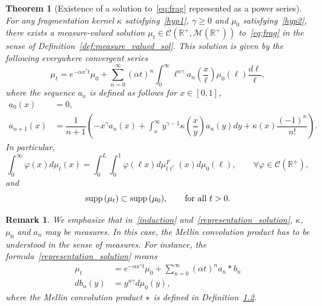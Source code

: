 \documentclass[10pt,a4paper]{amsart}
\numberwithin{equation}{section}
\newcommand*\dst{\displaystyle}
\renewcommand*\a{\alpha}
\newcommand*\R{\mathbb{R}}
\newcommand*\M{\mathcal{M}}
\newcommand{\clC}{\mathcal{C}}
\newcommand{\MT}[1]{{\textcolor{black}{#1}}}
\newcommand*\supp{{\mbox{\small\rm supp}}\,}
\let\oldforall\forall
\renewcommand*{\forall}{\mathrel{\oldforall}}
\newtheorem{theo}[defi]{Theorem}
\newtheorem{rema}[defi]{Remark}
\begin{document}
\begin{theo}[Existence of a solution to~\eqref{eq:frag} represented as a power series]\label{thm:power_serie}
For any fragmentation kernel $\kappa $ satisfying~\eqref{hyp1}, $\gamma\geq 0$ and $\mu_0$ satisfying~\eqref{hyp2}, there exists a measure-valued solution $\mu_t\in\clC(\R^+,\M(\R^+))$ to~\eqref{eq:frag} in the sense of Definition~\ref{def:measure_valued_sol}. This solution is given by the following everywhere convergent series
\begin{equation}\label{representation_solution}
\mu_t = e^{-\a x^{\gamma}t} \mu_0 + \sum_{n=0}^{\infty} (\a t)^n
\dst\int_0^{\infty} \ell^{n\gamma}a_n\left(\dfrac{x}{\ell}\right)\mu_0(\ell) \dfrac{d\ell}\ell{},
\end{equation}
where the sequence $a_n$ is defined as follows for $x\in [0,1]$,
\begin{equation}\label{induction}
\begin{split}
a_0(x) &=0, \\
 a_{n+1}(x) &= \dfrac{1}{n+1}\left(-x^{\gamma}a_n(x)+ \dst\int_x^{\infty} y^{\gamma-1} \kappa \left(\dfrac{x}{y} \right)a_n(y)dy + \kappa(x) \dfrac{(-1)^n}{n!}\right).
\end{split}
\end{equation}
In particular,
\begin{equation}\label{weakform}
\dst\int_0^{\infty} \varphi(x) d\mu_t(x) = \dst\int_0^{L} \dst\int_0^{1} \varphi(\ell x) d \mu_{t\ell^{\gamma}}^{F} (x)d\mu_0(\ell),\qquad \forall \varphi\in \clC(\R^+),
\end{equation}
and
\begin{equation}
\supp(\mu_t)\subset \supp(\mu_0), \qquad \text{for all } t>0.
\end{equation}

\end{theo}



\begin{rema}\label{remark1}
We emphasize that in~\eqref{induction} and~\eqref{representation_solution}, $\kappa$, $\mu_0$ and $a_n$ may be measures. In this case, the Mellin convolution product has to be understood in the sense of measures. For instance, the formula~\eqref{representation_solution} means
\begin{align}
\mu_t &= e^{-\a x^{\gamma}t} \mu_0 + \sum_{n=0}^{\infty} (\a t)^n a_n \ast b_n \label{remark1E1}
\\
 db_n(y) &=y^{n\gamma } d\mu _0(y), \label{remark1E2}
\end{align}
where the Mellin convolution product $\MT{\ast}$ is defined in Definition~\href{https://ahl.centre-mersenne.org/item/AHL_2024__7__621_0/}{1.2}.
\end{rema}
\end{document}
